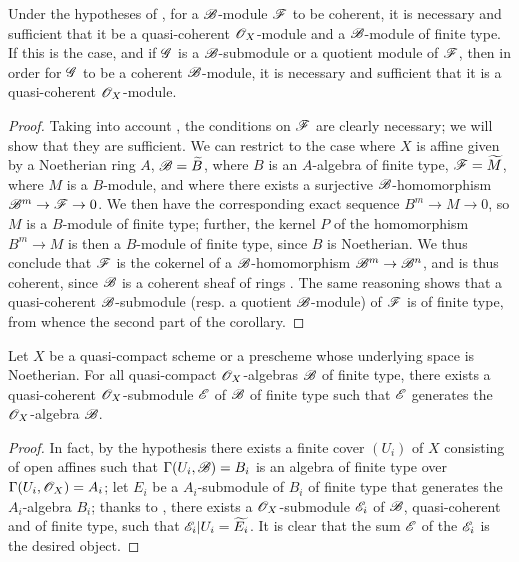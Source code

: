 \begin{cor}[9.6.4]
\label{1.9.6.4}
Under the hypotheses of , for a $\mathscr{B}$-module $\mathscr{F}$ to be coherent, it is necessary and sufficient that it be a quasi-coherent $\mathscr{O}_X$-module and a $\mathscr{B}$-module of finite type.
If this is the case, and if $\mathscr{G}$ is a $\mathscr{B}$-submodule or a quotient module of $\mathscr{F}$, then in order for $\mathscr{G}$ to be a coherent $\mathscr{B}$-module, it is necessary and sufficient that it is a quasi-coherent $\mathscr{O}_X$-module.
\end{cor}

\begin{proof}
\label{proof-1.9.6.4}
Taking into account , the conditions on $\mathscr{F}$ are clearly necessary; we will show that they are sufficient.
We can restrict to the case where $X$ is affine given by a Noetherian ring $A$, $\mathscr{B}=\widetilde{B}$, where $B$ is an $A$-algebra of finite type, $\mathscr{F}=\widetilde{M}$, where $M$ is a $B$-module, and where there exists a surjective $\mathscr{B}$-homomorphism $\sh{B}^m\to\sh{F}\to0$.
We then have the corresponding exact sequence $B^m\to M\to0$, so $M$ is a $B$-module of finite type; further, the kernel $P$ of the homomorphism $B^m\to M$ is then a $B$-module of finite type, since $B$ is Noetherian.
We thus conclude  that $\mathscr{F}$ is the cokernel of a $\mathscr{B}$-homomorphism $\sh{B}^m\to\sh{B}^n$, and is thus coherent, since $\mathscr{B}$ is a coherent sheaf of rings .
The same reasoning shows that a quasi-coherent $\mathscr{B}$-submodule (resp. a quotient $\mathscr{B}$-module) of $\mathscr{F}$ is of finite type, from whence the second part of the corollary.
\end{proof}

\begin{prop}[9.6.5]
\label{1.9.6.5}
Let $X$ be a quasi-compact scheme or a prescheme whose underlying space is Noetherian.
For all quasi-compact $\mathscr{O}_X$-algebras $\mathscr{B}$ of finite type, there exists a quasi-coherent $\mathscr{O}_X$-submodule $\mathscr{E}$ of $\mathscr{B}$ of finite type such that $\mathscr{E}$ generates  the $\mathscr{O}_X$-algebra $\mathscr{B}$.
\end{prop}

\begin{proof}
\label{proof-1.9.6.5}
In fact, by the hypothesis there exists a finite cover $(U_i)$ of $X$ consisting of open affines such that $\Gamma(U_i,\mathscr{B})=B_i$ is an algebra of finite type over $\Gamma(U_i,\mathscr{O}_X)=A_i$; let $E_i$ be a $A_i$-submodule of $B_i$ of finite type that generates the $A_i$-algebra $B_i$; thanks to , there exists a $\mathscr{O}_X$-submodule $\mathscr{E}_i$ of $\mathscr{B}$, quasi-coherent and of finite type, such that $\mathscr{E}_i|U_i=\widetilde{E_i}$.
It is clear that the sum $\mathscr{E}$ of the $\mathscr{E}_i$ is the desired object.
\end{proof}

